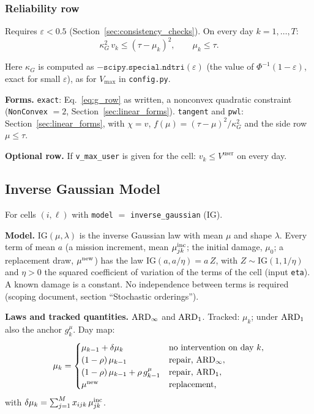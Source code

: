\subsubsection{Reliability row}

Requires $\varepsilon < 0.5$ (Section~\ref{sec:consistency_checks}). On every day
$k = 1, \ldots, T$:
\begin{equation}
  \kappa_G^2\, v_k \leq (\tau - \mu_k)^2, \qquad \mu_k \leq \tau.
  \label{eq:g_row}
\end{equation}

Here $\kappa_G$ is computed as $-\texttt{scipy.special.ndtri}(\varepsilon)$ (the value
of $\Phi^{-1}(1 - \varepsilon)$, exact for small $\varepsilon$), as for
$V_{\max}$ in \texttt{config.py}.

\textbf{Forms.} \texttt{exact}: Eq.~\eqref{eq:g_row} as written, a nonconvex
quadratic constraint (\texttt{NonConvex} $= 2$, Section~\ref{sec:linear_forms}).
\texttt{tangent} and \texttt{pwl}: Section~\ref{sec:linear_forms}, with $\chi = v$,
$f(\mu) = (\tau - \mu)^2/\kappa_G^2$ and the side row $\mu \leq \tau$.

\textbf{Optional row.} If \texttt{v\_max\_user} is given for the cell:
$v_k \leq V^{\mathrm{user}}$ on every day.

\subsection{Inverse Gaussian Model}
\label{sec:dyn_ig}

For cells $(i,\ell)$ with \texttt{model} $=$ \texttt{inverse\_gaussian} (IG).

\textbf{Model.} $\mathrm{IG}(\mu, \lambda)$ is the inverse Gaussian law with mean
$\mu$ and shape $\lambda$. Every term of mean $a$ (a mission increment, mean
$\mu^{\mathrm{inc}}_{jk}$; the initial damage, $\mu_0$; a replacement draw, $\mu^{\mathrm{new}}$)
has the law $\mathrm{IG}(a, a/\eta) = a\,Z$, with $Z \sim \mathrm{IG}(1, 1/\eta)$
and $\eta > 0$ the squared coefficient of variation of the terms of the cell (input \texttt{eta}). A known damage is a
constant. No independence between terms is required (scoping document, section
``Stochastic orderings'').

\textbf{Laws and tracked quantities.} $\mathrm{ARD}_{\infty}$ and $\mathrm{ARD}_{1}$. Tracked: $\mu_k$;
under $\mathrm{ARD}_{1}$ also the anchor $g^{\mu}_k$. Day map:
\begin{equation}
  \mu_k = \begin{cases}
    \mu_{k-1} + \delta\mu_k & \text{no intervention on day } k,\\
    (1-\rho)\,\mu_{k-1} & \text{repair, } \mathrm{ARD}_{\infty},\\
    (1-\rho)\,\mu_{k-1} + \rho\, g^{\mu}_{k-1} & \text{repair, } \mathrm{ARD}_{1},\\
    \mu^{\mathrm{new}} & \text{replacement,}
  \end{cases}
  \label{eq:ig_map}
\end{equation}
with $\delta\mu_k = \sum_{j=1}^{M} x_{ijk}\,\mu^{\mathrm{inc}}_{jk}$.

